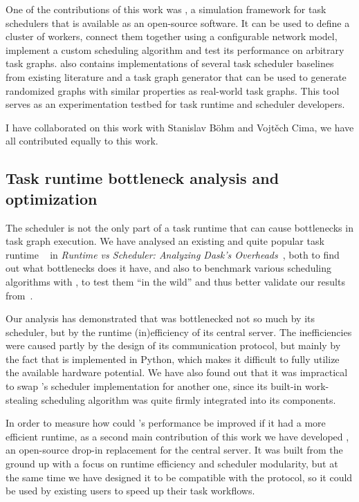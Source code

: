 One of the contributions of this work was \estee{}, a simulation framework for task
schedulers that is available as an open-source software.
It can be used to define a cluster of workers, connect them together using a configurable network
model, implement a custom scheduling algorithm and test its performance on arbitrary task graphs.
\estee{} also contains implementations of several task scheduler baselines from existing literature
and a task graph generator that can be used to generate randomized graphs with similar properties as
real-world task graphs. This tool serves as an experimentation testbed for task runtime and scheduler
developers.

I have collaborated on this work with Stanislav Böhm and Vojtěch Cima, we have all contributed
equally to this work.

\subsection{Task runtime bottleneck analysis and optimization}
The scheduler is not the only part of a task runtime that can cause bottlenecks in task graph
execution. We have analysed an existing and quite popular task runtime \dask{}~\cite{dask} in
\emph{Runtime vs Scheduler: Analyzing Dask's Overheads}~\cite{rsds}, both to find out what
bottlenecks does it have, and also to benchmark various scheduling algorithms with \dask{},
to test them ``in the wild'' and thus better validate our results from~\cite{estee}.

Our analysis has demonstrated that \dask{} was bottlenecked not so much by its scheduler, but
by the runtime (in)efficiency of its central server. The inefficiencies were caused partly by
the design of its communication protocol, but mainly by the fact that \dask{} is implemented in
Python, which makes it difficult to fully utilize the available hardware potential. We have
also found out that it was impractical to swap \dask{}'s scheduler implementation for another one,
since its built-in work-stealing scheduling algorithm was quite firmly integrated into its
components.

In order to measure how could \dask{}'s performance be improved if it had a more efficient runtime,
as a second main contribution of this work we have developed \rsds{}, an open-source drop-in
replacement for the \dask{} central server.
It was built from the ground up with a focus on runtime efficiency and scheduler modularity, but at
the same time we have designed it to be compatible with the \dask{} protocol, so it could be used
by existing \dask{} users to speed up their task workflows.

